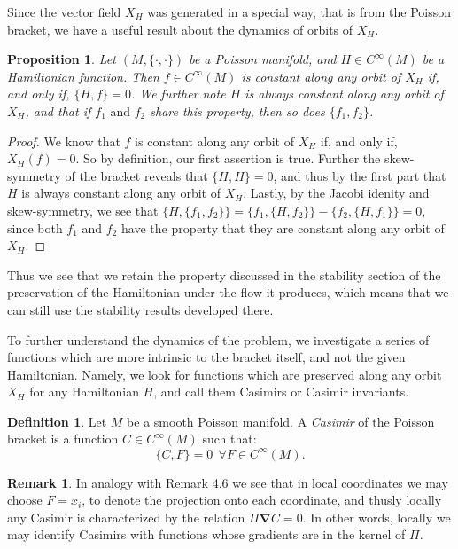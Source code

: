 \documentclass[psamsfonts,12pt]{amsart}
\newcommand\0{\mathbf{0}}
\newcommand\grad{\boldsymbol{\nabla}}
\theoremstyle{plain}
\newtheorem{prop}[thm]{Proposition}
\theoremstyle{definition}
\newtheorem{dfn}[thm]{Definition} %
\newtheorem{rmk}[thm]{Remark}
\begin{document}
Since the vector field $X_H$ was generated in a special way, that is from the Poisson bracket, we have a useful result about the dynamics of orbits of $X_H$.

\begin{prop}
Let $(M,\{\cdot,\cdot\})$ be a Poisson manifold, and $H\in C^\infty(M)$ be a Hamiltonian function.  Then $f\in C^\infty(M)$ is constant along any orbit of $X_H$ if, and only if, $\{H,f\}=0$.  We further note $H$ is always constant along any orbit of $X_H$, and that if $f_1 \text{ and } f_2$ share this property, then so does $\{f_1,f_2\}$.
\end{prop}
\begin{proof}
We know that $f$ is constant along any orbit of $X_H$ if, and only if, $X_H(f)=0$.  So by definition, our first assertion is true.  Further the skew-symmetry of the bracket reveals that $\{H,H\}=0$, and thus by the first part that $H$ is always constant along any orbit of $X_H$.  Lastly, by the Jacobi idenity and skew-symmetry, we see that $\{H,\{f_1,f_2\}\}=\{f_1,\{H,f_2\}\}-\{f_2,\{H,f_1\}\}=0$, since both $f_1$ and $f_2$ have the property that they are constant along any orbit of $X_H$.
\end{proof}

Thus we see that we retain the property discussed in the stability section of the preservation of the Hamiltonian under the flow it produces, which means that we can still use the stability results developed there.

To further understand the dynamics of the problem, we investigate a series of functions which are more intrinsic to the bracket itself, and not the given Hamiltonian.  Namely, we look for functions which are preserved along any orbit $X_H$ for any Hamiltonian $H$, and call them Casimirs or Casimir invariants.

\begin{dfn}
Let $M$ be a smooth Poisson manifold.  A \textit{Casimir} of the Poisson bracket is a function $C\in C^\infty(M)$ such that:
\[
\{C,F\}=0 \ \ \forall F\in C^\infty(M).
\]
\end{dfn}

\begin{rmk}
In analogy with Remark 4.6 we see that in local coordinates we may choose $F=x_i$, to denote the projection onto each coordinate, and thusly locally any Casimir is characterized by the relation $\Pi \grad C=0$.  In other words, locally we may identify Casimirs with functions whose gradients are in the kernel of $\Pi$.
\end{rmk}
\end{document}
